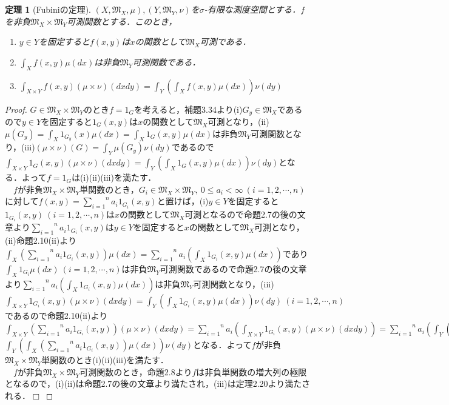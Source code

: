 \documentclass[a4paper,11pt]{jsarticle}
\newtheorem{theorem}[definition]{定理}
\newtheorem{proof}{証明}
\def\qed{\hfill $\Box$}
\begin{document}
%
%
%
\begin{theorem}[Fubiniの定理]
$(X,\mathfrak{M}_X,\mu ),(Y,\mathfrak{M}_Y,\nu )$を$\sigma$-有限な測度空間とする．$f$を非負$\mathfrak{M}_X\times\mathfrak{M}_Y$可測関数とする．このとき，
\begin{enumerate}
\renewcommand{\labelenumi}{(\roman{enumi})}
\item $y\in Y$を固定すると$f(x,y)$は$x$の関数として$\mathfrak{M}_X$可測である．
\item $\int_Xf(x,y)\mu(dx)$は非負$\mathfrak{M}_Y$可測関数である．
\item $\int_{X\times Y}f(x,y)(\mu\times\nu)(dxdy)=\int_Y\left(\int_Xf(x,y)\mu(dx)\right)\nu(dy)$
\end{enumerate}
\end{theorem}
\begin{proof}
$G\in \mathfrak{M}_X\times\mathfrak{M}_Y$のとき$f=1_G$を考えると，補題3.34より(i)$G_y\in \mathfrak{M}_X$であるので$y\in Y$を固定すると$1_G(x,y)$は$x$の関数として$\mathfrak{M}_X$可測となり，(ii)$\mu(G_y)=\int_X1_{G_y}(x)\mu(dx)=\int_X1_G(x,y)\mu(dx)$は非負$\mathfrak{M}_Y$可測関数となり，(iii)$(\mu\times\nu)(G)=\int_Y\mu(G_y)\nu(dy)$であるので$\int_{X\times Y}1_G(x,y)(\mu\times\nu)(dxdy)=\int_Y\left(\int_X1_G(x,y)\mu(dx)\right)\nu(dy)$となる．よって$f=1_G$は(i)(ii)(iii)を満たす．\\
{\ }{\ }$f$が非負$\mathfrak{M}_X\times\mathfrak{M}_Y$単関数のとき，$G_i\in\mathfrak{M}_X\times\mathfrak{M}_Y,{\ }0\leq a_i<\infty {\ }(i=1,2,\cdots,n)$に対して$f(x,y)=\overset{n}{\underset{i=1}{\sum}} a_i 1_{G_i}(x,y)$と置けば，(i)$y\in Y$を固定すると$1_{G_i}(x,y){\ }(i=1,2,\cdots,n)$は$x$の関数として$\mathfrak{M}_X$可測となるので命題2.7の後の文章より$\overset{n}{\underset{i=1}{\sum}} a_i 1_{G_i}(x,y)$は$y\in Y$を固定すると$x$の関数として$\mathfrak{M}_X$可測となり，(ii)命題2.10(ii)より$\int_X \left(\overset{n}{\underset{i=1}{\sum}} a_i 1_{G_i}(x,y)\right)\mu(dx)=\overset{n}{\underset{i=1}{\sum}} a_i \left(\int_X 1_{G_i}(x,y) \mu(dx)\right)$であり$\int_X1_{G_i}\mu(dx){\ }(i=1,2,\cdots,n)$は非負$\mathfrak{M}_Y$可測関数であるので命題2.7の後の文章より$\overset{n}{\underset{i=1}{\sum}} a_i \left(\int_X 1_{G_i}(x,y) \mu(dx)\right)$は非負$\mathfrak{M}_Y$可測関数となり，(iii)$\int_{X\times Y}1_{G_i}(x,y)(\mu\times\nu)(dxdy)=\int_Y\left(\int_X1_{G_i}(x,y)\mu(dx)\right)\nu(dy){\ }(i=1,2,\cdots,n)$であるので命題2.10(ii)より$\int_{X\times Y}\left(\overset{n}{\underset{i=1}{\sum}} a_i 1_{G_i}(x,y)\right)(\mu\times\nu)(dxdy)=\overset{n}{\underset{i=1}{\sum}}a_i\left(\int_{X\times Y}1_{G_i}(x,y)(\mu\times\nu)(dxdy)\right)=\overset{n}{\underset{i=1}{\sum}}a_i\left(\int_Y\left(\int_X1_{G_i}(x,y)\mu(dx)\right)\nu(dy)\right)=\int_Y\left(\overset{n}{\underset{i=1}{\sum}} a_i \left(\int_X 1_{G_i}(x,y) \mu(dx)\right)\right)\nu(dy)=$ \\ $\int_Y\left(\int_X\left(\overset{n}{\underset{i=1}{\sum}} a_i 1_{G_i}(x,y)\right)\mu(dx)\right)\nu(dy)$となる．よって$f$が非負$\mathfrak{M}_X\times\mathfrak{M}_Y$単関数のとき(i)(ii)(iii)を満たす．\\
{\ }{\ }$f$が非負$\mathfrak{M}_X\times\mathfrak{M}_Y$可測関数のとき，命題2.8より$f$は非負単関数の増大列の極限となるので，(i)(ii)は命題2.7の後の文章より満たされ，(iii)は定理2.20より満たされる．\qed
\end{proof}
\end{document}
